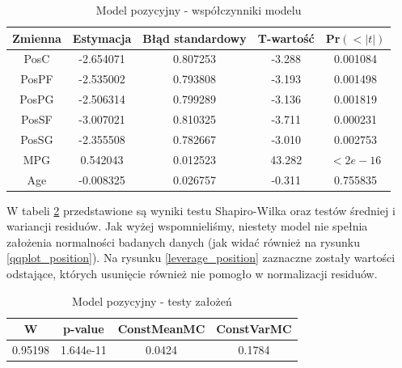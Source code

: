 \documentclass[11pt,a4paper]{article}
\begin{document}
\begin{table}[H]
	\begin{center}
		\begin{tabular}{| c | c | c | c | c |}
			\hline
			Zmienna & Estymacja & Błąd standardowy & T-wartość & Pr$(<|t|)$\\ \hline
			PosC & -2.654071 &  0.807253 & -3.288 & 0.001084 \\ \hline
			PosPF &-2.535002 &  0.793808 & -3.193 & 0.001498 \\ \hline
			PosPG &-2.506314 &  0.799289 & -3.136 &  0.001819 \\ \hline
			PosSF &-3.007021 &  0.810325 & -3.711 & 0.000231\\ \hline
			PosSG &-2.355508 &  0.782667 & -3.010 & 0.002753 \\ \hline
			MPG   & 0.542043 &  0.012523 & 43.282 & $< 2e-16$\\ \hline
			Age   &-0.008325 &  0.026757 & -0.311 & 0.755835 \\ \hline
		\end{tabular}
		\caption{Model pozycyjny - współczynniki modelu}
		\label{position}
	\end{center}
\end{table}
W tabeli \ref{zalozenia_position} przedstawione są wyniki testu Shapiro-Wilka oraz testów średniej i wariancji residuów. Jak wyżej wspomnieliśmy, niestety model nie spełnia założenia normalności badanych danych (jak widać również na rysunku \ref{qqplot_position}). Na rysunku \ref{leverage_position} zaznaczne zostały wartości odstające, których usunięcie również nie pomogło w normalizacji residuów.
\begin{table}[H]
	\begin{center}
		\begin{tabular}{| c | c | c | c |}
			\hline
			W & p-value & ConstMeanMC & ConstVarMC\\ \hline
			0.95198 & 1.644e-11 & 0.0424 & 0.1784 \\ \hline
		\end{tabular}
		\caption{Model pozycyjny - testy założeń}
		\label{zalozenia_position}
	\end{center}
\end{table}
\end{document}

